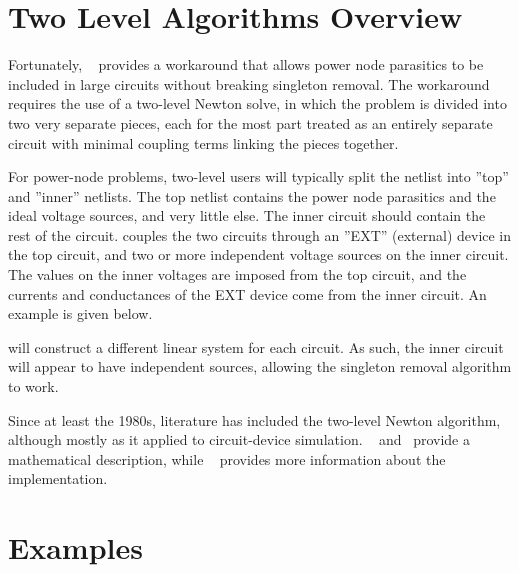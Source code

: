 \section{Two Level Algorithms Overview}
\label{twolevel_Overview}

Fortunately, \Xyce{}~\cite{xyceBookChapter:2011} provides a workaround 
that allows power node parasitics to be included in large circuits without breaking singleton 
removal.  The workaround requires the use of a two-level Newton solve,
in which the problem is divided into two very separate pieces, each
for the most part treated as an entirely separate circuit with minimal coupling terms linking the pieces together.  

For power-node problems, two-level users will typically split the netlist 
into ''top'' and ''inner'' netlists.  The top netlist contains the
power node parasitics and the ideal voltage sources, and very little else.
The inner circuit should contain the rest of the circuit.  \Xyce{} couples the two
circuits through an ''EXT'' (external) device in the top circuit,
and two or more independent voltage sources on the inner circuit.  The
values on the inner voltages are imposed from the top circuit, and
the currents and conductances of the EXT device come from the inner
circuit.  An example is given below.

\Xyce{} will construct a different linear system for each circuit. As such, the inner circuit will appear to have independent sources, allowing the singleton removal algorithm to work.

Since at least the 1980s, literature has included the two-level Newton algorithm, although mostly as it applied to 
circuit-device simulation.  ~\cite{twolevelnewton} and~\cite{Mayaram2} provide a mathematical description, while ~\cite{xyceBookChapter:2011} provides more information about the \Xyce{} implementation.

\section{Examples}
\label{twolevel_Examples}

